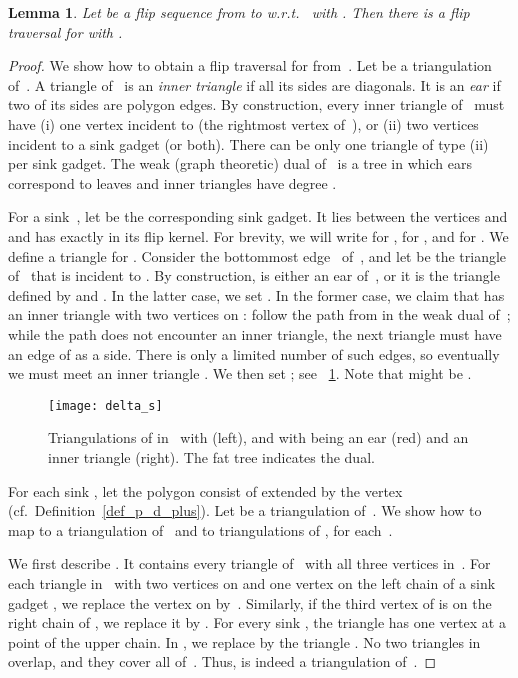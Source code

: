 \documentclass[a4paper,11pt]{article}
\newtheorem{lemma}[theorem]{Lemma}
\begin{document}
\begin{lemma}\label{lem:flip_traversal}
Let  be a flip sequence from  to  w.r.t.~ 
with .
Then there is a flip traversal  for  
with .
\end{lemma}
\begin{proof}
We show how to obtain a flip traversal  for
 from~.
Let  be a triangulation of~.
A triangle of~ is an \emph{inner triangle} if all its sides are 
diagonals. 
It is an \emph{ear} if two of its sides are polygon edges.
By construction, every inner triangle of~ must have
(i) one vertex incident to  (the rightmost vertex of~), 
or (ii) two vertices incident to a sink gadget (or both).
There can be only one triangle of type (ii) per sink gadget.
The weak (graph theoretic) dual of~ is a tree 
in which ears correspond to leaves and inner triangles have degree .

For a sink~, let  be the corresponding sink gadget.
It lies between the vertices  and  and has exactly  in its flip kernel.
For brevity, we will write  for ,  for , and  for .
We define a triangle   for .
Consider the bottommost edge~ of~, and let  be the triangle of~ that is incident to .
By construction,  is either an ear of~, or it is the triangle defined by  and .
In the latter case, we set .
In the former case, we claim that  has an inner triangle  with two vertices on :
follow the path from  in the weak dual of~;
while the path does not encounter an inner triangle, the next triangle must have an edge of  as a side.
There is only a limited number of such edges, so eventually we must meet an inner triangle .
We then set ; see \figurename~\ref{fig_delta_s}.
Note that  might be .


\begin{figure}
\centering
\texttt{[image: delta\_s]}
\caption{Triangulations of  in~ with  (left),
and with  being an ear (red) and  an inner triangle (right).
The fat tree indicates the dual.
}
\label{fig_delta_s}
\end{figure}

For each sink , let the polygon  consist of  extended by the vertex~ (cf.~Definition~\ref{def_p_d_plus}).
Let  be a triangulation of~.
We show how to map  to a triangulation  of~ and to triangulations  of , for each~.

We first describe .
It contains every triangle of~ with all three vertices in~.
For each triangle  in~ with two vertices on  and one vertex on the left chain of a sink gadget , we replace the vertex on  by~.
Similarly, if the third vertex of  is on the right chain of , we replace it by .
For every sink , the triangle  has one vertex at a point  of the upper chain.
In , we replace  by the triangle .
No two triangles in  overlap, and they cover all of~.
Thus,  is indeed a triangulation of~.


\end{proof}
\end{document}
